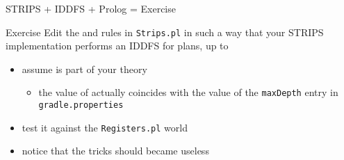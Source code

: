 \documentclass[presentation]{beamer}\mode<presentation>{\usetheme{AMSBolognaFC}}
\begin{document}
\begin{frame}[c]{STRIPS + IDDFS + Prolog = Exercise}
    
    \startExercise

    \begin{block}{Exercise \currentExercise}
        Edit the  and  rules in \texttt{Strips.pl} in such a way that your STRIPS implementation performs an IDDFS for plans, up to 
        \begin{itemize}
            \item assume  is part of your theory
            \begin{itemize}
                \item the value of  actually coincides with the value of the \texttt{maxDepth} entry in \texttt{gradle.properties}
            \end{itemize}

            \item test it against the \texttt{Registers.pl} world

            \item notice that the  tricks should became useless
        \end{itemize}
    \end{block}


\end{frame}

\section*{}

\frame{\titlepage}

\section*{\refname}

% 	
% 	

\end{document}
